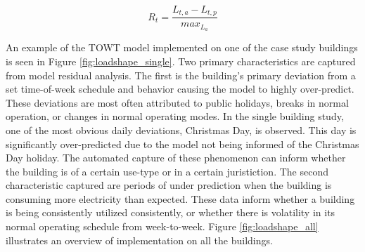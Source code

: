 \begin{equation}
\label{eq:residualerror}
R_t = \frac{L_{t,a} - L_{t,p}}{max_{L_a}}
\end{equation}

An example of the TOWT model implemented on one of the case study buildings is seen in Figure \ref{fig:loadshape_single}. Two primary characteristics are captured from model residual analysis. The first is the building's primary deviation from a set time-of-week schedule and behavior causing the model to highly over-predict. These deviations are most often attributed to public holidays, breaks in normal operation, or changes in normal operating modes. In the single building study, one of the most obvious daily deviations, Christmas Day, is observed. This day is significantly over-predicted due to the model not being informed of the Christmas Day holiday. The automated capture of these phenomenon can inform whether the building is of a certain use-type or in a certain juristiction. The second characteristic captured are periods of under prediction when the building is consuming more electricity than expected. These data inform whether a building is being consistently utilized consistently, or whether there is volatility in its normal operating schedule from week-to-week. Figure \ref{fig:loadshape_all} illustrates an overview of implementation on all the buildings.